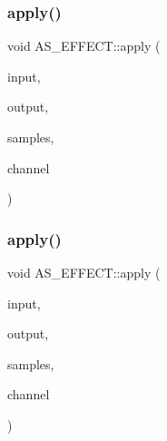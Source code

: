 \mbox{\label{class_a_s___e_f_f_e_c_t_a888ec464e417c6654da11f893f1aa97f}} 
\subsubsection{apply()\hspace{0.1cm}{\footnotesize\ttfamily [2/3]}}
{\footnotesize\ttfamily void A\+S\+\_\+\+E\+F\+F\+E\+C\+T\+::apply (\begin{DoxyParamCaption}\item[{float $\ast$}]{input,  }\item[{float $\ast$}]{output,  }\item[{int}]{samples,  }\item[{\textbf{ S\+A\+C\+Bitstream\+::\+Channel\+Type\+::channeltype}}]{channel }\end{DoxyParamCaption})}

\mbox{\label{class_a_s___e_f_f_e_c_t_a888ec464e417c6654da11f893f1aa97f}} 
\subsubsection{apply()\hspace{0.1cm}{\footnotesize\ttfamily [3/3]}}
{\footnotesize\ttfamily void A\+S\+\_\+\+E\+F\+F\+E\+C\+T\+::apply (\begin{DoxyParamCaption}\item[{float $\ast$}]{input,  }\item[{float $\ast$}]{output,  }\item[{int}]{samples,  }\item[{\textbf{ S\+A\+C\+Bitstream\+::\+Channel\+Type\+::channeltype}}]{channel }\end{DoxyParamCaption})}

\mbox{\label{class_a_s___e_f_f_e_c_t_a321c7ed4825c9d286d184ce7cd3cd829}} 
